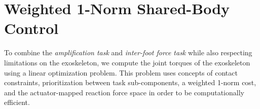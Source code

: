 \documentclass[utf8]{frontiersSCNS}
\begin{document}
%












\section{Weighted 1-Norm Shared-Body Control}\label{sec:opt}

To combine the \emph{amplification task} and \emph{inter-foot force task} while also respecting limitations on the exoskeleton, we compute the joint torques of the exoskeleton using a linear optimization problem. This problem uses concepts of contact constraints, prioritization between task sub-components, a weighted 1-norm cost, and the actuator-mapped reaction force space in order to be computationally efficient.
\end{document}
